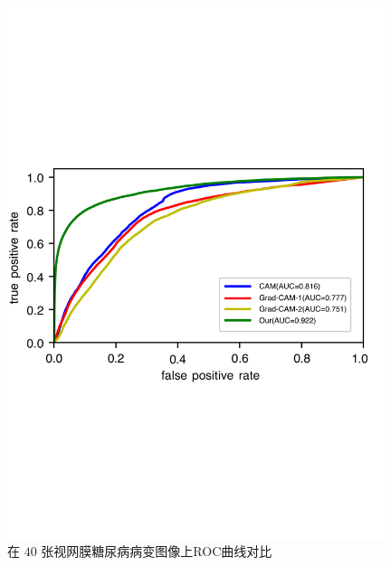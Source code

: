\begin{figure}[H]
	\centering
	\includegraphics[width=0.98\textwidth]{figure/ROC_cam_grad_cam_our_diabetic_retinopathy}
	\caption[在$40$张视网膜糖尿病病变图像上ROC曲线对比]{在 $40$ 张视网膜糖尿病病变图像上ROC曲线对比}
	\label{fig:roc_cam_grad_cam_our_diabetic_retinopathy}
\end{figure}
